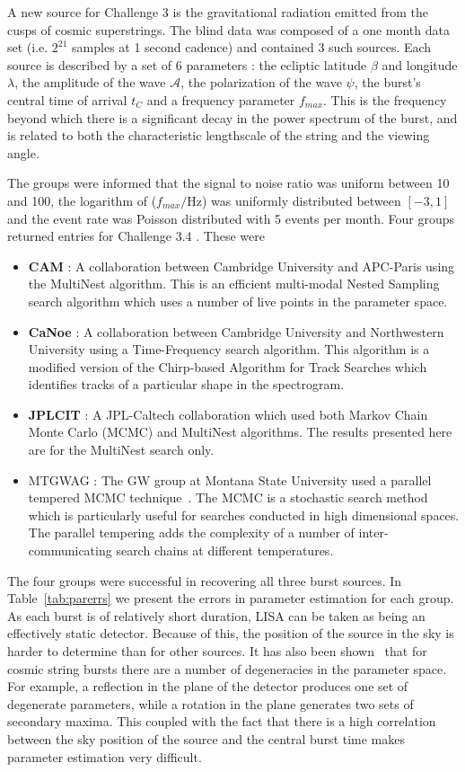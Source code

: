 \documentclass{iopart}
\begin{document}
A new source for Challenge 3 is the gravitational radiation emitted from the cusps of cosmic superstrings.  The blind data was composed of a one month data set (i.e. $2^{21}$ samples at 1 second cadence) and contained 3 such sources.  Each source is described
by a set of 6 parameters : the ecliptic latitude $\beta$ and longitude $\lambda$, the amplitude of the wave ${\mathcal A}$, the polarization of the wave $\psi$, the burst's
central time of arrival $t_C$ and a frequency parameter $f_{max}$.  This is the frequency beyond which there is a significant decay in the power spectrum of the burst, and is related to both the characteristic lengthscale of the string and the viewing angle.

The groups were informed that the signal to noise ratio was uniform between 10 and 100, the logarithm of ($f_{max}/$Hz) was uniformly distributed between $[-3,1]$ and the event rate was Poisson distributed with 5 events per month.  Four groups returned entries for Challenge 3.4 .  These were
\begin{itemize}
\item \textbf{CAM} :  A collaboration between Cambridge University and APC-Paris using the MultiNest algorithm. This is an efficient multi-modal
Nested Sampling search algorithm which uses a number of live points in the parameter space.  
\item \textbf{CaNoe} : A collaboration between Cambridge University and Northwestern University using a Time-Frequency search algorithm. This algorithm is a modified
version of the Chirp-based Algorithm for Track Searches which identifies tracks of a particular shape in the spectrogram.
\item \textbf{JPLCIT} : A JPL-Caltech collaboration which used both Markov Chain Monte Carlo (MCMC) and MultiNest algorithms.  The results presented here are for 
the MultiNest search only.
\item MTGWAG : The GW group at Montana State University used a parallel tempered MCMC technique~\cite{keycornish}.  The MCMC is a stochastic search method which is particularly
useful for searches conducted in high dimensional spaces.  The parallel tempering adds the complexity of a number of inter-communicating search
chains at different temperatures.
\end{itemize}

The four groups were successful in recovering all three burst sources.  In Table~\ref{tab:parerrs} we present the errors in parameter estimation for each group.  As each burst is of relatively short duration, LISA can be taken as being an effectively static detector.  Because of this, the position of the source in the sky is harder to determine than for other sources.  It has also been shown~\cite{keycornish} that for cosmic string bursts there are a number of degeneracies in the parameter space.  For example, a reflection in the plane of the detector produces one set of degenerate parameters, while a rotation in the plane generates two sets of secondary maxima.  This coupled with the fact that there is a high correlation between the sky position of the source and the central burst time makes parameter estimation very difficult.  
\end{document}
